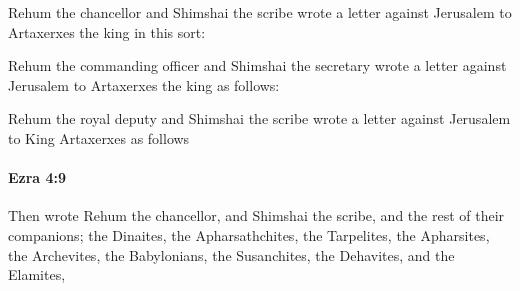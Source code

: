 			\begin{versebox}
					\item[BHS] 
					\item[LXX] 
					\item[ASV] Rehum the chancellor and Shimshai the scribe wrote a letter against Jerusalem to Artaxerxes the king in this sort:
					\item[NIV] Rehum the commanding officer and Shimshai the secretary wrote a letter against Jerusalem to Artaxerxes the king as follows:
					\item[NRSV] Rehum the royal deputy and Shimshai the scribe wrote a letter against Jerusalem to King Artaxerxes as follows
			\end{versebox}

		\paragraph{Ezra 4:9} %
			\label{EZRA-4-9}

			Then wrote Rehum the chancellor, and Shimshai the scribe, and the rest of their companions; the Dinaites, the Apharsathchites, the Tarpelites, the Apharsites, the Archevites, the Babylonians, the Susanchites, the Dehavites, and the Elamites,

